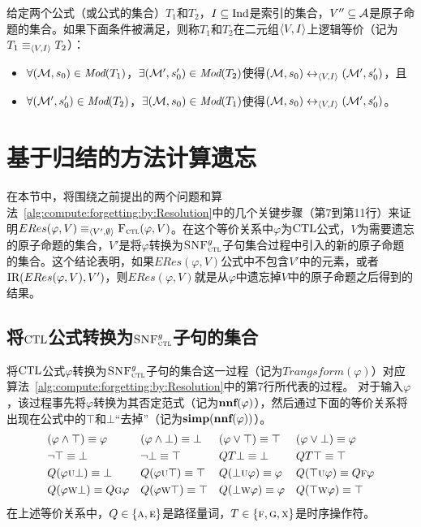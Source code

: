 \begin{definition}
	给定两个公式（或公式的集合）$T_1$和$T_2$，$I\subseteq \textrm{Ind}$是索引的集合，$V''\subseteq {\cal A}$是原子命题的集合。如果下面条件被满足，则称$T_1$和$T_2$在二元组${\langle{V,I}\rangle}$上逻辑等价（记为$T_1\equiv_{{\langle{V,I}\rangle}} T_2$）：
	\begin{itemize}
		\item $\forall ({\cal M},s_0)\in \textit{Mod}(T_1)$，$\exists ({\cal M}',s_0')\in \textit{Mod}(T_2)$使得$({\cal M},s_0) \leftrightarrow_{{\langle{V, I}\rangle}} ({\cal M}',s_0')$，且
		\item $\forall ({\cal M}',s_0')\in \textit{Mod}(T_2)$，$\exists ({\cal M},s_0)\in \textit{Mod}(T_1)$使得$({\cal M},s_0) \leftrightarrow_{{\langle{V, I}\rangle}} ({\cal M}',s_0')$。
	\end{itemize}
	
\end{definition}



\section{基于归结的方法计算遗忘}
\label{chp4:sect:resf}
在本节中，将围绕之前提出的两个问题和算法~\ref{alg:compute:forgetting:by:Resolution}中的几个关键步骤（第7到第11行）来证明$ERes(\varphi, V) \equiv_{{\langle{V',\emptyset}\rangle}} {\textsc{F}_{\textsc{ctl}}}(\varphi, V)$。在这个等价关系中$\varphi$为$\textrm{CTL}$公式，$V$为需要遗忘的原子命题的集合，$V'$是将$\varphi$转换为${\textsc{SNF}_{\textsc{ctl}}^g}$子句集合过程中引入的新的原子命题的集合。这个结论表明，如果$ERes(\varphi, V)$公式中不包含$V'$中的元素，或者$\textrm{IR}(ERes(\varphi, V), V')$，则$ERes(\varphi, V)$就是从$\varphi$中遗忘掉$V$中的原子命题之后得到的结果。

\subsection{将$\textrm{CTL}$公式转换为${\textsc{SNF}_{\textsc{ctl}}^g}$子句的集合}
将$\textrm{CTL}$公式$\varphi$转换为${\textsc{SNF}_{\textsc{ctl}}^g}$子句的集合这一过程（记为$Trangsform(\varphi)$）对应算法~\ref{alg:compute:forgetting:by:Resolution}中的第7行所代表的过程。
对于输入$\varphi$，该过程事先将$\varphi$转换为其否定范式（记为$\textbf{nnf}(\varphi)$），然后通过下面的等价关系\cite{zhang2014resolution,DBLP:books/el/leeuwen90/Emerson90}将出现在公式中的$\top$和$\bot$“去掉”（记为$\textbf{simp}(\textbf{nnf}(\varphi))$）。
\begin{align*}
	& (\varphi \wedge \top) \equiv \varphi && (\varphi \wedge \bot) \equiv \bot && (\varphi \vee \top)\equiv \top && (\varphi \vee \bot) \equiv \varphi \\
	& \neg \top \equiv \bot && \neg \bot \equiv \top && QT \bot \equiv \bot && QT \top \equiv \top  \\
	& Q(\varphi \textsc{u} \bot) \equiv \bot  && Q(\varphi \textsc{u} \top) \equiv \top && Q(\bot \textsc{u} \varphi) \equiv \varphi && Q(\top \textsc{u} \varphi) \equiv Q\textsc{f} \varphi\\
	& Q(\varphi \textsc{w} \bot) \equiv Q \textsc{g} \varphi  && Q(\varphi \textsc{w} \top) \equiv \top && Q(\bot \textsc{w} \varphi) \equiv \varphi && Q(\top \textsc{w} \varphi) \equiv \top
\end{align*}
在上述等价关系中，$Q\in \{\textsc{a},\textsc{e}\}$是路径量词，$T\in \{\textsc{f}, \textsc{g}, \textsc{x}\}$是时序操作符。

